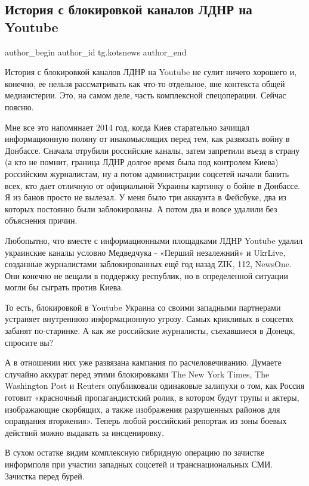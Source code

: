  
 
 
 
 
 
\subsection{История с блокировкой каналов ЛДНР на Youtube}
\label{sec:04_02_2022.tg.kotsnews.1.blokirovka_ldnr_youtube}
 
\ifcmt
 author_begin
   author_id tg.kotsnews
 author_end
\fi

История с блокировкой каналов ЛДНР на Youtube не сулит ничего хорошего и,
конечно, ее нельзя рассматривать как что-то отдельное, вне контекста общей
медиаистерии. Это, на самом деле, часть комплексной спецоперации. Сейчас
поясню. 

Мне все это напоминает 2014 год, когда Киев старательно зачищал информационную
поляну от инакомыслящих перед тем, как развязать войну в Донбассе. Сначала
отрубили российские каналы, затем запретили въезд в страну (а кто не помнит,
граница ЛДНР долгое время была под контролем Киева) российским журналистам, ну
а потом администрации соцсетей начали банить всех, кто дает отличную от
официальной Украины картинку о бойне в Донбассе. Я из банов просто не вылезал.
У меня было три аккаунта в Фейсбуке, два из которых постоянно были
заблокированы. А потом два и вовсе удалили без объяснения причин.

Любопытно, что вместе с информационными площадками ЛДНР Youtube удалил
украинские каналы условно Медведчука - «Перший незалежний» и UkrLive, созданные
журналистами заблокированных ещё год назад ZIK, 112, NewsOne. Они конечно не
вещали в поддержку республик, но в определенной ситуации могли бы сыграть
против Киева.

То есть, блокировкой в Youtube Украина со своими западными партнерами устраняет
внутреннюю информационную угрозу. Самых крикливых в соцсетях забанят
по-старинке. А как же российские журналисты, съехавшиеся в Донецк, спросите вы?

А в отношении них уже развязана кампания по расчеловечиванию. Думаете случайно
аккурат перед этими блокировками The New York Times, The Washington Post и
Reuters опубликовали одинаковые залипухи о том, как Россия готовит «красночный
пропагандистский ролик, в котором будут трупы и актеры, изображающие скорбящих,
а также изображения разрушенных районов для оправдания вторжения». Теперь любой
российский репортаж из зоны боевых действий можно выдавать за инсценировку.

В сухом остатке видим комплексную гибридную операцию по зачистке информполя при
участии западных соцсетей и транснациональных СМИ. Зачистка перед бурей.
